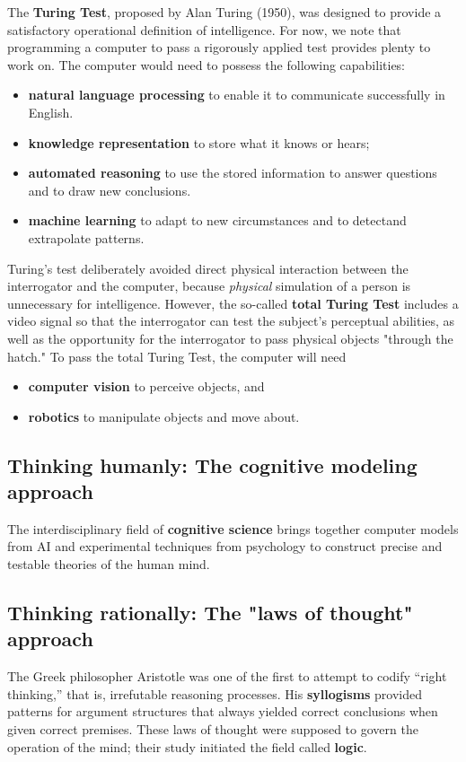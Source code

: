\documentclass[a4paper,10pt,twoside]{book}
\begin{document}
The \textbf{Turing Test}, proposed by Alan Turing (1950), was designed to provide a satisfactory operational definition of intelligence. For now, we note that programming a computer to pass a rigorously applied test provides plenty to work on. The computer would need to possess the following capabilities:
\begin{itemize}
    \item\textbf{natural language processing} to enable it to communicate successfully in English.
    \item\textbf{knowledge representation} to store what it knows or hears;
    \item\textbf{automated reasoning} to use the stored information to answer questions and to draw new conclusions.
    \item\textbf{machine learning} to adapt to new circumstances and to detectand extrapolate patterns.
\end{itemize}
Turing's test deliberately avoided direct physical interaction between the interrogator and the computer, because \textit{physical} simulation of a person is unnecessary for intelligence. However, the so-called \textbf{total Turing Test} includes a video signal so that the interrogator can test the subject's perceptual abilities, as well as the opportunity for the interrogator to pass physical objects "through the hatch." To pass the total Turing Test, the computer will need
\begin{itemize}
    \item\textbf{computer vision} to perceive objects, and
    \item\textbf{robotics} to manipulate objects and move about.
\end{itemize}

\subsection{Thinking humanly: The cognitive modeling approach}

The interdisciplinary field of \textbf{cognitive science} brings together computer models from AI and experimental techniques from psychology to construct precise and testable theories of the human mind.

\subsection{Thinking rationally: The "laws of thought" approach}

The Greek philosopher Aristotle was one of the first to attempt to codify “right thinking,” that is, irrefutable reasoning processes. His \textbf{syllogisms} provided patterns for argument structures that always yielded correct conclusions when given correct premises. These laws of thought were supposed to govern the operation of the mind; their study initiated the field called \textbf{logic}.
\end{document}
